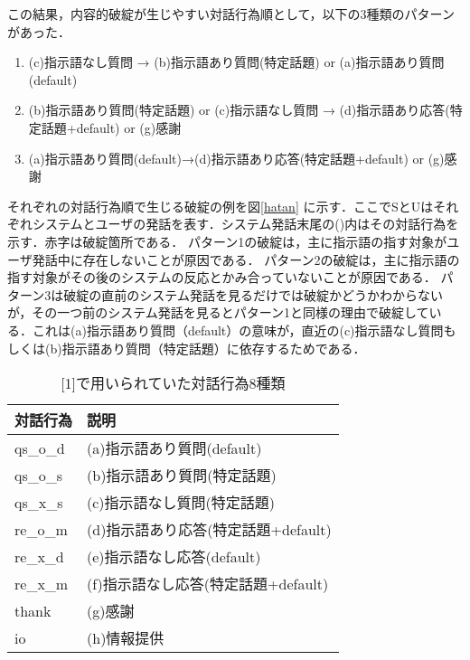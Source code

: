 \documentclass[a4,twocolumn,dvipdfmx]{jarticle}
\begin{document}
この結果，内容的破綻が生じやすい対話行為順として，以下の3種類のパターンがあった．
\begin{enumerate}
\item (c)指示語なし質問 → (b)指示語あり質問(特定話題) or (a)指示語あり質問(default)
\item (b)指示語あり質問(特定話題) or (c)指示語なし質問 → (d)指示語あり応答(特定話題+default) or (g)感謝
\item (a)指示語あり質問(default)→(d)指示語あり応答(特定話題+default) or (g)感謝
\end{enumerate}

それぞれの対話行為順で生じる破綻の例を図\ref{hatan} に示す．ここでSとUはそれぞれシステムとユーザの発話を表す．システム発話末尾の()内はその対話行為を示す．赤字は破綻箇所である．
パターン1の破綻は，主に指示語の指す対象がユーザ発話中に存在しないことが原因である．
パターン2の破綻は，主に指示語の指す対象がその後のシステムの反応とかみ合っていないことが原因である．
パターン3は破綻の直前のシステム発話を見るだけでは破綻かどうかわからないが，その一つ前のシステム発話を見るとパターン1と同様の理由で破綻している．これは(a)指示語あり質問（default）の意味が，直近の(c)指示語なし質問もしくは(b)指示語あり質問（特定話題）に依存するためである．

\begin{table}[tb]
\small
    \caption{[1]で用いられていた対話行為8種類}\label{tab:DA}
    \centering
    \begin{tabular}{|l|l|}\hline 
         対話行為&説明  \\ \hline \hline
         qs\_o\_d&(a)指示語あり質問(default) \\ \hline
         qs\_o\_s&(b)指示語あり質問(特定話題) \\ \hline
         qs\_x\_s&(c)指示語なし質問(特定話題) \\ \hline
         re\_o\_m&(d)指示語あり応答(特定話題+default) \\ \hline
         re\_x\_d&(e)指示語なし応答(default) \\ \hline
         re\_x\_m&(f)指示語なし応答(特定話題+default) \\ \hline
         thank&(g)感謝 \\ \hline
         io&(h)情報提供 \\ \hline
    \end{tabular}
\end{table}
\end{document}
